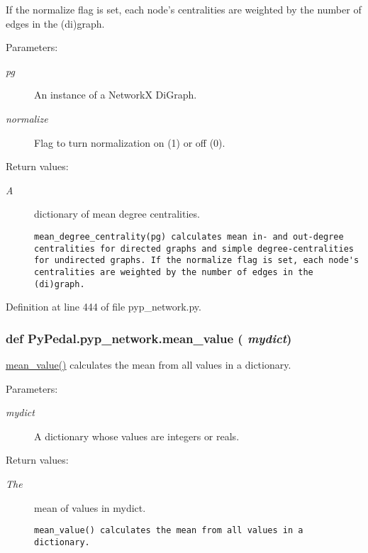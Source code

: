 If the normalize flag is set, each node's centralities are weighted by the number of edges in the (di)graph. \begin{Desc}
\item[Parameters:]
\begin{description}
\item[{\em pg}]An instance of a Network\-X Di\-Graph. \item[{\em normalize}]Flag to turn normalization on (1) or off (0). \end{description}
\end{Desc}
\begin{Desc}
\item[Return values:]
\begin{description}
\item[{\em A}]dictionary of mean degree centralities.

\footnotesize\begin{verbatim}mean_degree_centrality(pg) calculates mean in- and out-degree
centralities for directed graphs and simple degree-centralities
for undirected graphs. If the normalize flag is set, each node's
centralities are weighted by the number of edges in the (di)graph.
\end{verbatim}
\normalsize
 \end{description}
\end{Desc}


Definition at line 444 of file pyp\_\-network.py.\hypertarget{namespacePyPedal_1_1pyp__network_f67aecda93c61a5b116b0025670ac3be}{
\subsubsection[mean\_\-value]{\setlength{\rightskip}{0pt plus 5cm}def Py\-Pedal.pyp\_\-network.mean\_\-value ( {\em mydict})}}
\label{namespacePyPedal_1_1pyp__network_f67aecda93c61a5b116b0025670ac3be}


\hyperlink{namespacePyPedal_1_1pyp__network_f67aecda93c61a5b116b0025670ac3be}{mean\_\-value()} calculates the mean from all values in a dictionary. 

\begin{Desc}
\item[Parameters:]
\begin{description}
\item[{\em mydict}]A dictionary whose values are integers or reals. \end{description}
\end{Desc}
\begin{Desc}
\item[Return values:]
\begin{description}
\item[{\em The}]mean of values in mydict.

\footnotesize\begin{verbatim}mean_value() calculates the mean from all values in a
dictionary.
\end{verbatim}
\normalsize
 \end{description}
\end{Desc}


